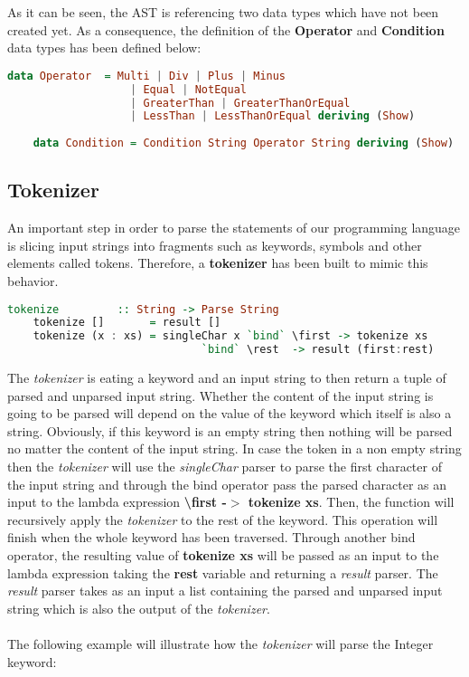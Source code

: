 \documentclass[a4paper, onecolumn]{article}
\begin{document}
    \noindent As it can be seen, the AST is referencing two data types which have not been created yet. As a consequence, the definition of the \textbf{Operator} and \textbf{Condition} data types has been defined below: 
    
    \begin{tcolorbox}
    \begin{lstlisting}[language=Haskell] 
    data Operator  = Multi | Div | Plus | Minus
                   | Equal | NotEqual
                   | GreaterThan | GreaterThanOrEqual 
                   | LessThan | LessThanOrEqual deriving (Show)
        
    data Condition = Condition String Operator String deriving (Show) 
    \end{lstlisting}
    \end{tcolorbox}
    
    \subsection{Tokenizer}
    
    An important step in order to parse the statements of our programming language is slicing input strings into fragments such as keywords, symbols and other elements called tokens. Therefore, a \textbf{tokenizer} has been built to mimic this behavior.
    
    \begin{tcolorbox}
    \begin{lstlisting}[language=Haskell] 
    tokenize         :: String -> Parse String
    tokenize []       = result []
    tokenize (x : xs) = singleChar x `bind` \first -> tokenize xs 
                              `bind` \rest  -> result (first:rest)
     \end{lstlisting}
    \end{tcolorbox}
    
    \noindent The \textit{tokenizer} is eating a keyword and an input string to then return a tuple of parsed and unparsed input string. Whether the content of the input string is going to be parsed will depend on the value of the keyword which itself is also a string. Obviously, if this keyword is an empty string then nothing will be parsed no matter the content of the input string. In case the token in a non empty string then the \textit{tokenizer} will use the \textit{singleChar} parser to parse the first character of the input string and through the bind operator pass the parsed character as an input to the lambda expression \textbf{\textbackslash first -$>$ tokenize xs}. Then, the function will recursively apply the \textit{tokenizer} to the rest of the keyword. This operation will finish when the whole keyword has been traversed. Through another bind operator, the resulting value of \textbf{tokenize xs} will be passed as an input to the lambda expression taking the \textbf{rest} variable and returning a \textit{result} parser. The \textit{result} parser takes as an input a list containing the parsed and unparsed input string which is also the output of the \textit{tokenizer}. \\ \\
    The following example will illustrate how the \textit{tokenizer} will parse the Integer keyword:
    
\end{document}
